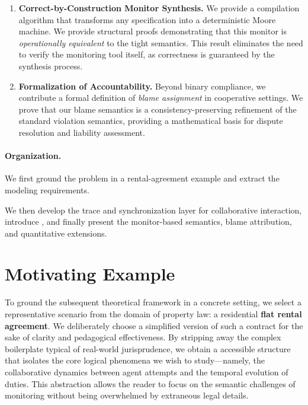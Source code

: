 \documentclass{article}
\begin{document}
\begin{enumerate}[label={(Con\arabic*)}]
\item \textbf{Correct-by-Construction Monitor Synthesis.}
We provide a compilation algorithm that transforms any \cDL{} specification into a deterministic Moore machine.
We provide structural proofs demonstrating that this monitor is \emph{operationally equivalent} to the tight semantics.
This result eliminates the need to verify the monitoring tool itself, as correctness is guaranteed by the synthesis process.

\item \textbf{Formalization of Accountability.}
Beyond binary compliance, we contribute a formal definition of \emph{blame assignment} in cooperative settings.
We prove that our blame semantics is a consistency-preserving refinement of the standard violation semantics, providing a mathematical basis for dispute resolution and liability assessment.

\end{enumerate}



\paragraph{Organization.}

We first ground the problem in a rental-agreement example and extract the modeling requirements.

We then develop the trace and synchronization layer for collaborative interaction, introduce \cDL, and finally present the monitor-based semantics, blame attribution, and quantitative extensions.




  \section{Motivating Example}
  \label{sec:motivating-example}

  To ground the subsequent theoretical framework in a concrete setting, we select a representative scenario from the domain of property law: a residential \textbf{flat rental agreement}.
We deliberately choose a simplified version of such a contract for the sake of clarity and pedagogical effectiveness.
By stripping away the complex boilerplate typical of real-world jurisprudence, we obtain a accessible structure that isolates the core logical phenomena we wish to study—namely, the collaborative dynamics between agent attempts and the temporal evolution of duties.
This abstraction allows the reader to focus on the semantic challenges of monitoring without being overwhelmed by extraneous legal details.
  
\end{document}
